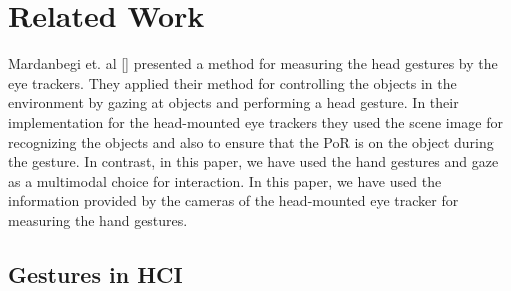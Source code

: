 \documentclass[jou,a4paper,notxfonts]{apa}
\begin{document}




\section{Related Work}

Mardanbegi et. al [] presented a method for measuring the head gestures by the eye trackers. They applied their method for controlling the objects in the environment by gazing at objects and performing a head gesture. In their implementation for the head-mounted eye trackers they used the scene image for recognizing the objects and also to ensure that the PoR is on the object during the gesture. In contrast, in this paper, we have used the hand gestures and gaze as a multimodal choice for interaction. In this paper, we have used the information provided by the cameras of the head-mounted eye tracker for measuring the hand gestures. 





%
\subsection{Gestures in HCI}
%
\end{document}
